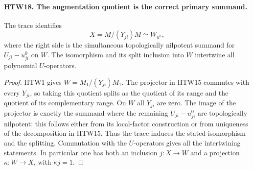 \paragraph{HTW18. The augmentation quotient is the correct primary summand.}
\label{claim:HTW18}
The trace identifies
\[
 X=M/(Y_{ji})M
       \simeq W_{u^0},
 \tag{HTW.21}
\]
where the right side is the simultaneous topologically
nilpotent summand for \(U_{ji}-u^0_{ji}\) on \(W\).
The isomorphism and its split inclusion into \(W\)
intertwine all polynomial \(U\)-operators.
\begin{proof}
HTW1 gives \(W=M_1/(Y_{ji})M_1\).  The projector
in HTW15 commutes with every \(Y_{ji}\), so taking
this quotient splits as the quotient of its range
and the quotient of its complementary range.
On \(W\) all \(Y_{ji}\) are zero.  The image of the
projector is exactly the summand where the remaining
\(U_{ji}-u^0_{ji}\) are topologically nilpotent:
this follows either from its local-factor construction
or from uniqueness of the decomposition in HTW15.
Thus the trace induces the stated isomorphism and
the splitting.  Commutation with the \(U\)-operators
gives all the intertwining statements.  In particular
one has both an inclusion \(j:X\to W\) and a
projection \(\kappa:W\to X\), with \(\kappa j=1\).
\end{proof}

